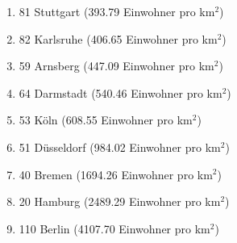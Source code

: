 \begin{enumerate}[itemsep=-6mm]
\item 81 Stuttgart (393.79 Einwohner pro km$^2$)
\item 82 Karlsruhe (406.65 Einwohner pro km$^2$)
\item 59 Arnsberg (447.09 Einwohner pro km$^2$)
\item 64 Darmstadt (540.46 Einwohner pro km$^2$)
\item 53 Köln (608.55 Einwohner pro km$^2$)
\item 51 Düsseldorf (984.02 Einwohner pro km$^2$)
\item 40 Bremen (1694.26 Einwohner pro km$^2$)
\item 20 Hamburg (2489.29 Einwohner pro km$^2$)
\item 110 Berlin (4107.70 Einwohner pro km$^2$)
\end{enumerate}